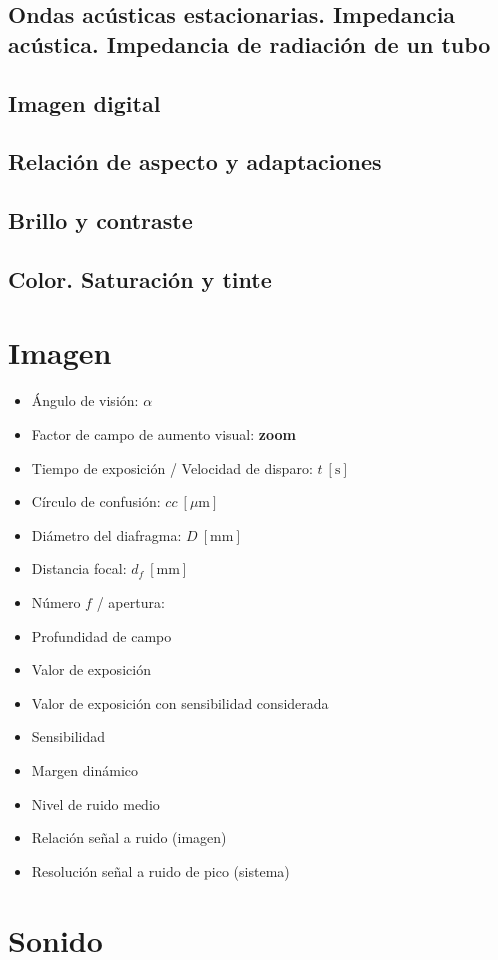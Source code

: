 \documentclass[a4paper]{book}
\begin{document}
\section{Ondas acústicas estacionarias. Impedancia acústica. Impedancia de radiación de un tubo}
\section{Imagen digital}
\section{Relación de aspecto y adaptaciones}
\section{Brillo y contraste}
\section{Color. Saturación y tinte}

\chapter{Imagen}
\begin{itemize}
	\item Ángulo de visión: $\alpha$
	\item Factor de campo de aumento visual: \textbf{zoom}
	\item Tiempo de exposición / Velocidad de disparo: $t\ [\textrm{s}]$
	\item Círculo de confusión: $cc\ [\mu\textrm{m}]$
	\item Diámetro del diafragma: $D\ [\textrm{mm}]$
	\item Distancia focal: $d_f\ [\textrm{mm}]$
	\item Número $f$ / apertura:
	\item Profundidad de campo
	\item Valor de exposición
	\item Valor de exposición con sensibilidad considerada
	\item Sensibilidad
	\item Margen dinámico
	\item Nivel de ruido medio
	\item Relación señal a ruido (imagen)
	\item Resolución señal a ruido de pico (sistema)
\end{itemize}
\chapter{Sonido}


% 
\end{document}
